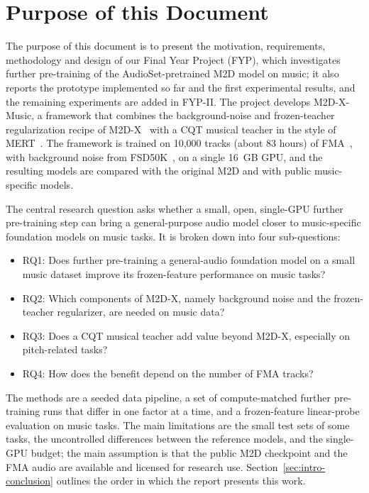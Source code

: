 \documentclass{FastFyp}
\begin{document}
\section{Purpose of this Document}
\label{sec:intro-purpose}
The purpose of this document is to present the motivation, requirements, methodology and design of our Final Year Project (FYP), which investigates further pre-training of the AudioSet-pretrained M2D model on music; it also reports the prototype implemented so far and the first experimental results, and the remaining experiments are added in FYP-II. The project develops M2D-X-Music, a framework that combines the background-noise and frozen-teacher regularization recipe of M2D-X~\cite{ref:Niizumi:2024m2dx} with a CQT musical teacher in the style of MERT~\cite{ref:Li:2024mert}. The framework is trained on 10,000 tracks (about 83 hours) of FMA~\cite{ref:Defferrard:2017fma}, with background noise from FSD50K~\cite{ref:Fonseca:2022fsd50k}, on a single 16~GB GPU, and the resulting models are compared with the original M2D and with public music-specific models.

The central research question asks whether a small, open, single-GPU further pre-training step can bring a general-purpose audio model closer to music-specific foundation models on music tasks. It is broken down into four sub-questions:
\begin{itemize}
  \item RQ1: Does further pre-training a general-audio foundation model on a small music dataset improve its frozen-feature performance on music tasks?
  \item RQ2: Which components of M2D-X, namely background noise and the frozen-teacher regularizer, are needed on music data?
  \item RQ3: Does a CQT musical teacher add value beyond M2D-X, especially on pitch-related tasks?
  \item RQ4: How does the benefit depend on the number of FMA tracks?
\end{itemize}
The methods are a seeded data pipeline, a set of compute-matched further pre-training runs that differ in one factor at a time, and a frozen-feature linear-probe evaluation on music tasks. The main limitations are the small test sets of some tasks, the uncontrolled differences between the reference models, and the single-GPU budget; the main assumption is that the public M2D checkpoint and the FMA audio are available and licensed for research use. Section~\ref{sec:intro-conclusion} outlines the order in which the report presents this work.
\end{document}
